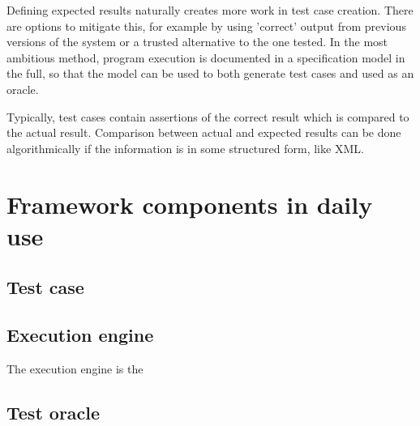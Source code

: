 \documentclass[12pt,a4paper,oneside,pdftex]{report}
\begin{document}
Defining expected results naturally creates more work in test case creation. There are options to mitigate this, for example by using 'correct' output from previous versions of the system or a trusted alternative to the one tested. In the most ambitious method, program execution is documented in a specification model in the full, so that the model can be used to both generate test cases and used as an oracle. \citep{pezze2008software}

Typically, test cases contain assertions of the correct result which is compared to the actual result. Comparison between actual and expected results can be done algorithmically if the information is in some structured form, like XML.

\section{Framework components in daily use}


\subsection{Test case}



\subsection{Execution engine}


The execution engine is the 

\subsection{Test oracle}
\end{document}
